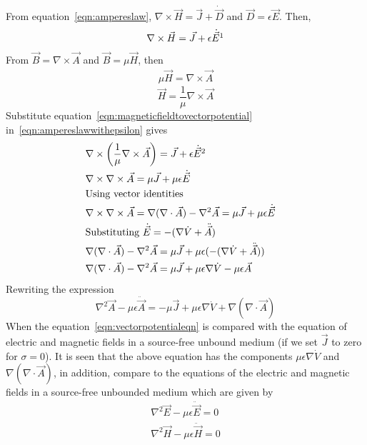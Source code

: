 From equation~\eqref{eqn:ampereslaw}, $\nabla\times\vec{H}=\vec{J}+\dot{\vec{D}}$
and $\vec{D}=\epsilon\vec{E}$. Then,
\begin{align}
\nabla\times\vec{H}=\vec{J}+\epsilon\dot{\vec{E}}\footnotemark
\label{eqn:ampereslawwithepsilon}
\end{align}
From $\vec{B}=\nabla\times\vec{A}$ and $\vec{B}=\mu\vec{H}$, then
\begin{align*}
\mu\vec{H}=\nabla\times\vec{A}
\end{align*}
\begin{equation}
\vec{H}=\dfrac{1}{\mu}\nabla\times\vec{A}
\label{eqn:magneticfieldtovectorpotential}
\end{equation}
Substitute equation~\eqref{eqn:magneticfieldtovectorpotential} in~\eqref{eqn:ampereslawwithepsilon} gives
\begin{align*}
&\nabla\times\left(\dfrac{1}{\mu}\nabla\times\vec{A}\right)=\vec{J}+\epsilon\dot{\vec{E}}\footnotemark&\\
&\nabla\times\nabla\times\vec{A}=\mu\vec{J}+\mu\epsilon\dot{\vec{E}}&\\
&\text{Using vector identities}&\\
&\nabla\times\nabla\times\vec{A}=\nabla(\nabla\cdot\vec{A}) -\nabla^{2}\vec{A}=\mu\vec{J}+\mu\epsilon\dot{\vec{E}}&\\
&\text{Substituting $\dot{\vec{E}}=-(\nabla\dot{V}+\ddot{\vec{A}})$}&\\
&\nabla(\nabla\cdot\vec{A}) -\nabla^{2}\vec{A}=\mu\vec{J}+\mu\epsilon(-(\nabla\dot{V}+\ddot{\vec{A}}))&\\
&\nabla(\nabla\cdot\vec{A}) -\nabla^{2}\vec{A}=\mu\vec{J}+\mu\epsilon\nabla\dot{V}-\mu\epsilon\vec{A}&
\end{align*}
Rewriting the expression
\begin{equation}
\nabla^{2}\vec{A}-\mu\epsilon\ddot{\vec{A}}=-\mu\vec{J}+\mu\epsilon\nabla\dot{V}+\nabla(\nabla\cdot\vec{A})
\label{eqn:vectorpotentialeqn}
\end{equation}
When the equation~\ref{eqn:vectorpotentialeqn} is compared with the equation of electric and magnetic fields in a source-free unbound medium (if we set $\vec{J}$ to zero for $\sigma=0$). It is seen that the above equation has the components $\mu\epsilon\nabla\dot{V}$ and $\nabla(\nabla\cdot\vec{A})$, in addition, compare to the equations of the electric and magnetic fields in a source-free unbounded medium which are given by
\begin{align*}
\nabla^{2}\vec{E}-\mu\epsilon\ddot{\vec{E}}=0\\
\nabla^{2}\vec{H}-\mu\epsilon\ddot{\vec{H}}=0
\end{align*}


